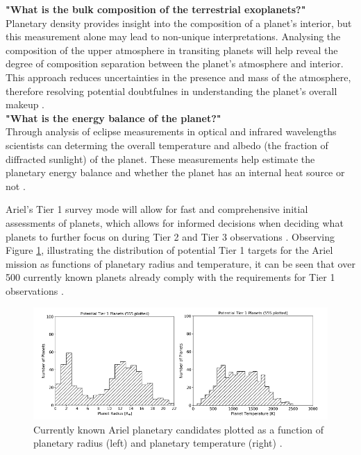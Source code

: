 \documentclass[12pt]{article}
\begin{document}
\textbf{"What is the bulk composition of the terrestrial exoplanets?"}\\
Planetary density provides insight into the composition of a planet's interior, but this measurement alone may lead to non-unique interpretations. Analysing the composition of the upper atmosphere in transiting planets will help reveal the degree 
of composition separation between the planet's atmosphere and interior. This approach reduces uncertainties in the presence and mass of the atmosphere, therefore resolving potential doubtfulnes in understanding the planet's overall makeup \cite{salvignol2024ariel}. \\

\textbf{"What is the energy balance of the planet?"}\\
Through analysis of eclipse measurements in optical and infrared wavelengths scientists can determing the overall temperature and albedo (the fraction of diffracted sunlight) of the planet. These measurements
help estimate the planetary energy balance and whether the planet has an internal heat source or not \cite{salvignol2024ariel}.

Ariel's Tier 1 survey mode will allow for fast and comprehensive initial assessments of planets, which allows for informed decisions when deciding what planets to further focus on during Tier 2 and Tier 3 observations \cite{salvignol2024ariel}.
Observing Figure \ref{fig:2}, illustrating the distribution of potential Tier 1 targets for the Ariel mission as functions of planetary radius and temperature, it can be seen that over 500 currently known planets already comply with the requirements for Tier 1 observations \cite{arielstudyreport,edwards2019updated}.

\begin{figure}[H]
    \centering
    \includegraphics[width=.9\textwidth]{tier 1 radius and temp plots.png}
    \caption{Currently known Ariel planetary candidates plotted as a function of planetary radius (left) and planetary temperature (right) \protect\cite{arielstudyreport}.}
    \label{fig:2}
\end{figure}
\end{document}
